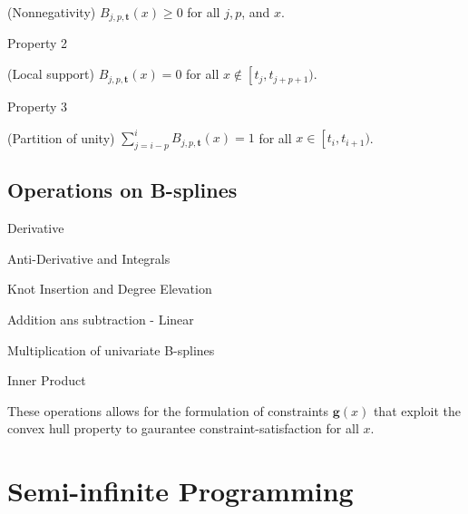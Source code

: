 (Nonnegativity) $B_{j, p, \mathbf{t}}(x) \geq 0$ for all $j, p$, and $x$.

Property 2

(Local support) $B_{j, p, \mathbf{t}}(x)=0$ for all $x \notin\left[t_j, t_{j+p+1}\right.)$.

Property 3

(Partition of unity) $\sum_{j=i-p}^i B_{j, p, \mathbf{t}}(x)=1$ for all $x \in\left[t_i, t_{i+1}\right.)$.


\subsection{Operations on B-splines}

Derivative

Anti-Derivative and Integrals

Knot Insertion and Degree Elevation

Addition ans subtraction - Linear

Multiplication of univariate B-splines

Inner Product


These operations allows for the formulation of constraints $\mathbf g(x)$ that exploit the convex hull property to gaurantee constraint-satisfaction for all $x$.

\section{Semi-infinite Programming}
